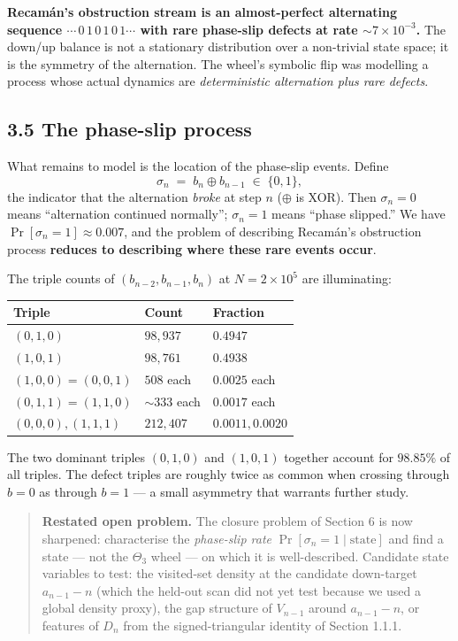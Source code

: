 \documentclass[
  11pt,
]{article}
\begin{document}
\textbf{Recamán's obstruction stream is an almost-perfect alternating
sequence \(\cdots\, 0\, 1\, 0\, 1\, 0\, 1 \cdots\) with rare phase-slip
defects at rate \(\sim 7 \times 10^{-3}\).} The down/up balance is not a
stationary distribution over a non-trivial state space; it is the
symmetry of the alternation. The wheel's symbolic flip was modelling a
process whose actual dynamics are \emph{deterministic alternation plus
rare defects}.

\hypertarget{the-phase-slip-process}{%
\subsection{3.5 The phase-slip process}\label{the-phase-slip-process}}

What remains to model is the location of the phase-slip events. Define
\[
\sigma_n \;=\; b_n \oplus b_{n-1} \;\in\; \{0, 1\},
\] the indicator that the alternation \emph{broke} at step \(n\)
(\(\oplus\) is XOR). Then \(\sigma_n = 0\) means ``alternation continued
normally''; \(\sigma_n = 1\) means ``phase slipped.'' We have
\(\Pr[\sigma_n = 1] \approx 0.007\), and the problem of describing
Recamán's obstruction process \textbf{reduces to describing where these
rare events occur}.

The triple counts of \((b_{n-2}, b_{n-1}, b_n)\) at
\(N = 2 \times 10^5\) are illuminating:

\begin{longtable}[]{@{}lll@{}}
\toprule\noalign{}
Triple & Count & Fraction \\
\midrule\noalign{}
\endhead
\bottomrule\noalign{}
\endlastfoot
\((0,1,0)\) & \(98{,}937\) & \(0.4947\) \\
\((1,0,1)\) & \(98{,}761\) & \(0.4938\) \\
\((1,0,0) = (0,0,1)\) & \(508\) each & \(0.0025\) each \\
\((0,1,1) = (1,1,0)\) & \(\sim 333\) each & \(0.0017\) each \\
\((0,0,0), (1,1,1)\) & \(212, 407\) & \(0.0011, 0.0020\) \\
\end{longtable}

The two dominant triples \((0,1,0)\) and \((1,0,1)\) together account
for \(98.85\%\) of all triples. The defect triples are roughly twice as
common when crossing through \(b = 0\) as through \(b = 1\) --- a small
asymmetry that warrants further study.

\begin{quote}
\textbf{Restated open problem.} The closure problem of Section 6 is now
sharpened: characterise the \emph{phase-slip rate}
\(\Pr[\sigma_n = 1 \mid \text{state}]\) and find a state --- not the
\(\Theta_3\) wheel --- on which it is well-described. Candidate state
variables to test: the visited-set density at the candidate down-target
\(a_{n-1} - n\) (which the held-out scan did not yet test because we
used a global density proxy), the gap structure of \(V_{n-1}\) around
\(a_{n-1} - n\), or features of \(D_n\) from the signed-triangular
identity of Section 1.1.1.
\end{quote}
\end{document}
